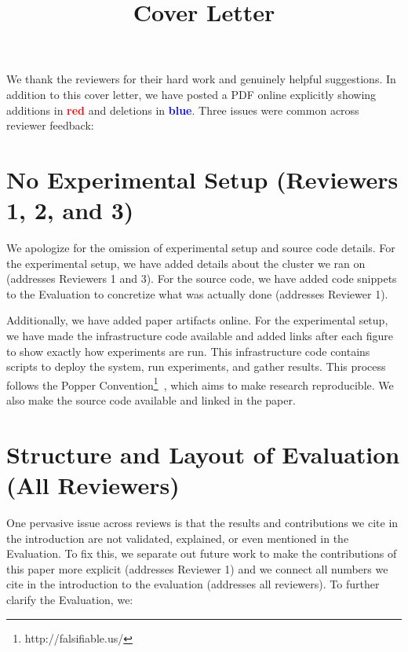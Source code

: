 \documentclass[onecolumn,conference]{IEEEtran}
\begin{document}
\title{Cover Letter}
\maketitle

We thank the reviewers for their hard work and genuinely helpful suggestions.
In addition to this cover letter, we have posted a PDF online explicitly
showing additions in \textcolor{red}{\textbf{red}} and deletions in
\textcolor{blue}{\textbf{blue}}. Three issues were common across reviewer
feedback:

\section{No Experimental Setup (Reviewers 1, 2, and 3)}

We apologize for the omission of experimental setup and source code details.
For the experimental setup, we have added details about the cluster we ran on
(addresses Reviewers 1 and 3). For the source code, we have added code snippets
to the Evaluation to concretize what was actually done (addresses Reviewer 1).  

Additionally, we have added paper artifacts online.  For the experimental
setup, we have made the infrastructure code available and added links after
each figure to show exactly how experiments are run.  This infrastructure code
contains scripts to deploy the system, run experiments, and gather results.
This process follows the Popper
Convention\footnote{http://falsifiable.us/}~\cite{jimenez_popper_2016}, which
aims to make research reproducible.  We also make the source code available and
linked in the paper.

\section{Structure and Layout of Evaluation (All Reviewers)}

One pervasive issue across reviews is that the results and contributions we
cite in the introduction are not validated, explained, or even mentioned in the
Evaluation.  To fix this, we separate out future work to make the contributions
of this paper more explicit (addresses Reviewer 1) and we connect all numbers
we cite in the introduction to the evaluation (addresses all reviewers).  To
further clarify the Evaluation, we:
\end{document}
